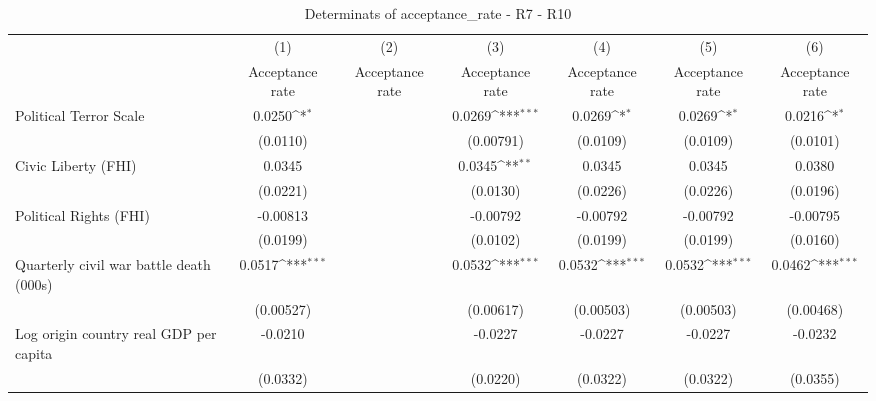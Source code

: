 \begin{table}[htbp]\centering
\def\sym#1{\ifmmode^{#1}\else\(^{#1}\)\fi}
\caption{Determinats of acceptance\_rate - R7 - R10}
\begin{tabular}{l*{6}{c}}
\hline\hline
                    &\multicolumn{1}{c}{(1)}&\multicolumn{1}{c}{(2)}&\multicolumn{1}{c}{(3)}&\multicolumn{1}{c}{(4)}&\multicolumn{1}{c}{(5)}&\multicolumn{1}{c}{(6)}\\
                    &\multicolumn{1}{c}{Acceptance rate}&\multicolumn{1}{c}{Acceptance rate}&\multicolumn{1}{c}{Acceptance rate}&\multicolumn{1}{c}{Acceptance rate}&\multicolumn{1}{c}{Acceptance rate}&\multicolumn{1}{c}{Acceptance rate}\\
\hline
Political Terror Scale&      0.0250\sym{*}  &                     &      0.0269\sym{***}&      0.0269\sym{*}  &      0.0269\sym{*}  &      0.0216\sym{*}  \\
                    &    (0.0110)         &                     &   (0.00791)         &    (0.0109)         &    (0.0109)         &    (0.0101)         \\
[1em]
Civic Liberty (FHI) &      0.0345         &                     &      0.0345\sym{**} &      0.0345         &      0.0345         &      0.0380         \\
                    &    (0.0221)         &                     &    (0.0130)         &    (0.0226)         &    (0.0226)         &    (0.0196)         \\
[1em]
Political Rights (FHI)&    -0.00813         &                     &    -0.00792         &    -0.00792         &    -0.00792         &    -0.00795         \\
                    &    (0.0199)         &                     &    (0.0102)         &    (0.0199)         &    (0.0199)         &    (0.0160)         \\
[1em]
Quarterly civil war battle death (000s)&      0.0517\sym{***}&                     &      0.0532\sym{***}&      0.0532\sym{***}&      0.0532\sym{***}&      0.0462\sym{***}\\
                    &   (0.00527)         &                     &   (0.00617)         &   (0.00503)         &   (0.00503)         &   (0.00468)         \\
[1em]
Log origin country real GDP per capita&     -0.0210         &                     &     -0.0227         &     -0.0227         &     -0.0227         &     -0.0232         \\
                    &    (0.0332)         &                     &    (0.0220)         &    (0.0322)         &    (0.0322)         &    (0.0355)         \\

\end{tabular}
\end{table}
